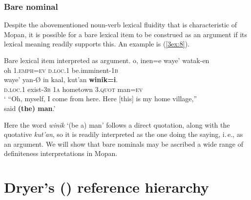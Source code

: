 \documentclass[output=paper]{langsci/langscibook}
\begin{document}
 
\subsubsection{Bare nominal}\label{3sec:214} 

Despite the abovementioned noun-verb lexical fluidity that is characteristic of Mopan, it is possible for a bare lexical item to be construed as an argument if its lexical meaning readily supports this.  An example is (\ref{3ex:8}).

\begin{exe}
\ex\label{3ex:8}
Bare lexical item interpreted as argument. 
\exi{}
\gll	o,	inen=e			waye'		watak-en \\
	oh	1.{\textsc{emph=ev}}	{\textsc{d.loc}}.1	be.imminent-1{\textsc{b}} \\
\glt
\exi{}
\gll	waye'		yan-Ø		in		kaal,			kut'an		{\textbf{winik=i}}. \\
	{\textsc{d.loc.1}}	exist-3{\textsc{b}}	{\textsc{1a}}	hometown		3.{\textsc{quot}}	man{\textsc{=ev}} \\
\glt 
` ``Oh, myself, I come from here. Here [this] is my home village,''\\said {\textbf{(the) man}}.'
\end{exe}

Here the word {\emph{winik}} `(be a) man' follows a direct quotation, along with the quotative {\emph{kut'an}}, so it is readily interpreted as the one doing the saying, i.\,e., as an argument. We will show that bare nominals may be ascribed a wide range of definiteness interpretations in Mopan.


\section{Dryer's (\citeyear{dryer:14}) reference hierarchy}\label{3sec:3}
\end{document}
